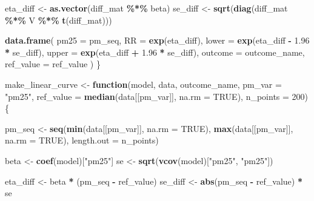 \documentclass[
]{article}
\newenvironment{Shaded}{\begin{snugshade}}{\end{snugshade}}
\newcommand{\AttributeTok}[1]{\textcolor[rgb]{0.13,0.29,0.53}{#1}}
\newcommand{\ConstantTok}[1]{\textcolor[rgb]{0.56,0.35,0.01}{#1}}
\newcommand{\ControlFlowTok}[1]{\textcolor[rgb]{0.13,0.29,0.53}{\textbf{#1}}}
\newcommand{\DecValTok}[1]{\textcolor[rgb]{0.00,0.00,0.81}{#1}}
\newcommand{\FloatTok}[1]{\textcolor[rgb]{0.00,0.00,0.81}{#1}}
\newcommand{\FunctionTok}[1]{\textcolor[rgb]{0.13,0.29,0.53}{\textbf{#1}}}
\newcommand{\NormalTok}[1]{#1}
\newcommand{\OtherTok}[1]{\textcolor[rgb]{0.56,0.35,0.01}{#1}}
\newcommand{\SpecialCharTok}[1]{\textcolor[rgb]{0.81,0.36,0.00}{\textbf{#1}}}
\newcommand{\StringTok}[1]{\textcolor[rgb]{0.31,0.60,0.02}{#1}}
\begin{document}
\begin{Shaded}
\begin{Highlighting}[]
\NormalTok{  eta\_diff }\OtherTok{\textless{}{-}} \FunctionTok{as.vector}\NormalTok{(diff\_mat }\SpecialCharTok{\%*\%}\NormalTok{ beta)}
\NormalTok{  se\_diff  }\OtherTok{\textless{}{-}} \FunctionTok{sqrt}\NormalTok{(}\FunctionTok{diag}\NormalTok{(diff\_mat }\SpecialCharTok{\%*\%}\NormalTok{ V }\SpecialCharTok{\%*\%} \FunctionTok{t}\NormalTok{(diff\_mat)))}

  \FunctionTok{data.frame}\NormalTok{(}
    \AttributeTok{pm25 =}\NormalTok{ pm\_seq,}
    \AttributeTok{RR =} \FunctionTok{exp}\NormalTok{(eta\_diff),}
    \AttributeTok{lower =} \FunctionTok{exp}\NormalTok{(eta\_diff }\SpecialCharTok{{-}} \FloatTok{1.96} \SpecialCharTok{*}\NormalTok{ se\_diff),}
    \AttributeTok{upper =} \FunctionTok{exp}\NormalTok{(eta\_diff }\SpecialCharTok{+} \FloatTok{1.96} \SpecialCharTok{*}\NormalTok{ se\_diff),}
    \AttributeTok{outcome =}\NormalTok{ outcome\_name,}
    \AttributeTok{ref\_value =}\NormalTok{ ref\_value}
\NormalTok{  )}
\NormalTok{\}}

\NormalTok{make\_linear\_curve }\OtherTok{\textless{}{-}} \ControlFlowTok{function}\NormalTok{(model, data, outcome\_name,}
                              \AttributeTok{pm\_var =} \StringTok{"pm25"}\NormalTok{,}
                              \AttributeTok{ref\_value =} \FunctionTok{median}\NormalTok{(data[[pm\_var]], }\AttributeTok{na.rm =} \ConstantTok{TRUE}\NormalTok{),}
                              \AttributeTok{n\_points =} \DecValTok{200}\NormalTok{) \{}

\NormalTok{  pm\_seq }\OtherTok{\textless{}{-}} \FunctionTok{seq}\NormalTok{(}\FunctionTok{min}\NormalTok{(data[[pm\_var]], }\AttributeTok{na.rm =} \ConstantTok{TRUE}\NormalTok{),}
                \FunctionTok{max}\NormalTok{(data[[pm\_var]], }\AttributeTok{na.rm =} \ConstantTok{TRUE}\NormalTok{),}
                \AttributeTok{length.out =}\NormalTok{ n\_points)}

\NormalTok{  beta }\OtherTok{\textless{}{-}} \FunctionTok{coef}\NormalTok{(model)[}\StringTok{"pm25"}\NormalTok{]}
\NormalTok{  se   }\OtherTok{\textless{}{-}} \FunctionTok{sqrt}\NormalTok{(}\FunctionTok{vcov}\NormalTok{(model)[}\StringTok{"pm25"}\NormalTok{, }\StringTok{"pm25"}\NormalTok{])}

\NormalTok{  eta\_diff }\OtherTok{\textless{}{-}}\NormalTok{ beta }\SpecialCharTok{*}\NormalTok{ (pm\_seq }\SpecialCharTok{{-}}\NormalTok{ ref\_value)}
\NormalTok{  se\_diff  }\OtherTok{\textless{}{-}} \FunctionTok{abs}\NormalTok{(pm\_seq }\SpecialCharTok{{-}}\NormalTok{ ref\_value) }\SpecialCharTok{*}\NormalTok{ se}


\end{Highlighting}
\end{Shaded}
\end{document}
